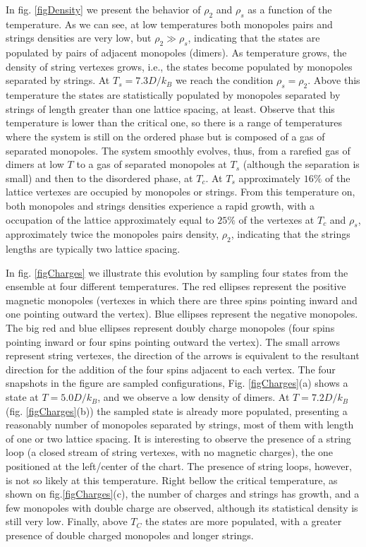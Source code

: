\documentclass[aps,showkeys,groupedaddress]{revtex4}
\begin{document}
In fig. \ref{figDensity} we present the behavior of $\rho_2$ and $\rho_s$ as a function of the temperature. As we can see, at low temperatures both monopoles pairs and strings densities are very low, but $\rho_2 \gg \rho_s$, indicating that the states are populated by pairs of adjacent monopoles (dimers). As temperature grows, the density of string vertexes grows, i.e., the states become populated by monopoles separated by strings. At $T_s = 7.3 D/k_B$ we reach the condition $\rho_s = \rho_2$. Above this temperature the states are statistically populated by monopoles separated by strings of length greater than one lattice spacing, at least. Observe that this temperature is lower than the critical one, so there is a range of temperatures where the system is still on the ordered phase but is composed of a gas of separated monopoles. The system smoothly evolves, thus, from a rarefied gas of dimers at low $T$ to a gas of separated monopoles at $T_s$ (although the separation is small) and then to the disordered phase, at $T_c$. At $T_s$ approximately $16\%$ of the lattice vertexes are occupied by monopoles or strings. From this temperature on, both monopoles and strings densities experience a rapid growth, with a occupation of the lattice approximately equal to $25\%$ of the vertexes at $T_c$ and $\rho_s$, approximately twice the monopoles pairs density, $\rho_2$, indicating that the strings lengths are typically two lattice spacing.

In fig. \ref{figCharges} we illustrate this evolution by sampling four states from the ensemble at four different temperatures. The red ellipses represent the positive magnetic monopoles (vertexes in which there are three spins pointing inward and one pointing outward the vertex). Blue ellipses represent the negative monopoles. The big red and blue ellipses represent doubly charge monopoles (four spins pointing inward or four spins pointing outward the vertex). The small arrows represent string vertexes, the direction of the arrows is equivalent to the resultant direction for the addition of the four spins adjacent to each vertex. The four snapshots in the figure are sampled configurations,  Fig. \ref{figCharges}(a) shows a state at $T=5.0 D/k_B$, and we observe a low density of dimers. At $T=7.2 D/k_B$ (fig. \ref{figCharges}(b)) the sampled state is already more populated, presenting a reasonably number of monopoles separated by strings, most of them with length of one or two lattice spacing. It is interesting to observe the presence of a string loop (a closed stream of string vertexes, with no magnetic charges), the one positioned at the left/center of the chart. The presence of string loops, however, is not so likely at this temperature. Right bellow the critical temperature, as shown on fig.\ref{figCharges}(c), the number of charges and strings has growth, and a few monopoles with double charge are observed, although its statistical density is still very low. Finally, above $T_C$ the states are more populated, with a greater presence of double charged monopoles and longer strings. 
\end{document}
